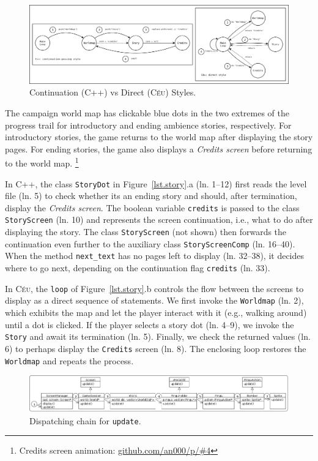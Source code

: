 \documentclass{vgtc}                          %
\newcommand{\CEU}{\textsc{C\'{e}u}\xspace}
\newcommand{\code}[1] {{\small{\texttt{#1}}}}
\begin{document}
\begin{figure}[!t]
\centering
\includegraphics[width=\textwidth]{continuation}
\caption{ Continuation (C++) vs Direct (\CEU) Styles.
\label{fig.story}
}
\end{figure}

The campaign world map has clickable blue dots in the two extremes of the
progress trail for introductory and ending ambience stories, respectively.
For introductory stories, the game returns to the world map after displaying 
the story pages.
For ending stories, the game also displays a \emph{Credits screen} before
returning to the world map.%
\footnote{Credits screen animation: \url{github.com/an000/p/#4} }

In C++, the class \code{StoryDot} in Figure~\ref{lst.story}.a (ln. 1--12) first
reads the level file (ln. 5) to check whether its an ending story and should,
after termination, display the \emph{Credits screen}.
%
The boolean variable \code{credits} is passed to the class
\code{StoryScreen} (ln. 10) and represents the screen continuation, i.e., what
to do after displaying the story.
The class \code{StoryScreen} (not shown) then forwards the continuation even
further to the auxiliary class \code{StoryScreenComp} (ln. 16--40).
%
When the method \code{next\_text} has no pages left to display (ln. 32--38),
it decides where to go next, depending on the continuation flag
\code{credits} (ln. 33).

In \CEU, the \code{loop} of Figure~\ref{lst.story}.b controls the flow between
the screens to display as a direct sequence of statements.
%
We first invoke the \code{Worldmap} (ln. 2), which exhibits the map and let
the player interact with it (e.g., walking around) until a dot is clicked.
If the player selects a story dot (ln. 4--9), we invoke the \code{Story}
and await its termination (ln. 5).
Finally, we check the returned values (ln. 6) to perhaps display the
\code{Credits} screen (ln. 8).
The enclosing loop restores the \code{Worldmap} and repeats the process.

\begin{figure}[t]
\centering
\includegraphics[width=\textwidth]{hierarchy}
\caption{Dispatching chain for \code{update}.
\label{fig.hier}
}
\end{figure}
\end{document}
